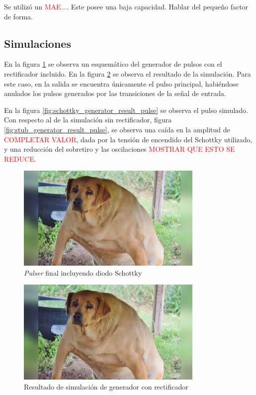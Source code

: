 Se utilizó un \textcolor{red}{MAE...}. Este posee una baja capacidad. Hablar del
pequeño factor de forma.

\subsection{Simulaciones}

En la figura \ref{fig:pulser_final_schematic} se observa un esquemático del
generador de pulsos con el rectificador incluido. En la figura
\ref{fig:generator_schottky_result_waves} se observa el resultado de la
simulación. Para este caso, en la salida se encuentra únicamente el pulso
principal, habiéndose anulados los pulsos generados por las transiciones de la
señal de entrada.

En la figura \ref{fig:schottky_generator_result_pulse} se observa el pulso
simulado. Con respecto al de la simulación sin rectificador, figura
\ref{fig:stub_generator_result_pulse}, se observa una caída en la amplitud de
\textcolor{red}{COMPLETAR VALOR}, dada por la tensión de encendido del Schottky
utilizado, y una reducción del sobretiro y las oscilaciones
\textcolor{red}{MOSTRAR QUE ESTO SE REDUCE}.

\begin{figure}[tbp]
    \centering
    \includegraphics[width=0.8\textwidth]{images/placeholder.jpg}
    \caption{\textit{Pulser} final incluyendo diodo Schottky}
    \label{fig:pulser_final_schematic}
\end{figure}

\begin{figure}[tbp]
    \centering
    \includegraphics[width=0.8\textwidth]{images/placeholder.jpg}
    \caption{Resultado de simulación de generador con rectificador}
    \label{fig:generator_schottky_result_waves}
\end{figure}

